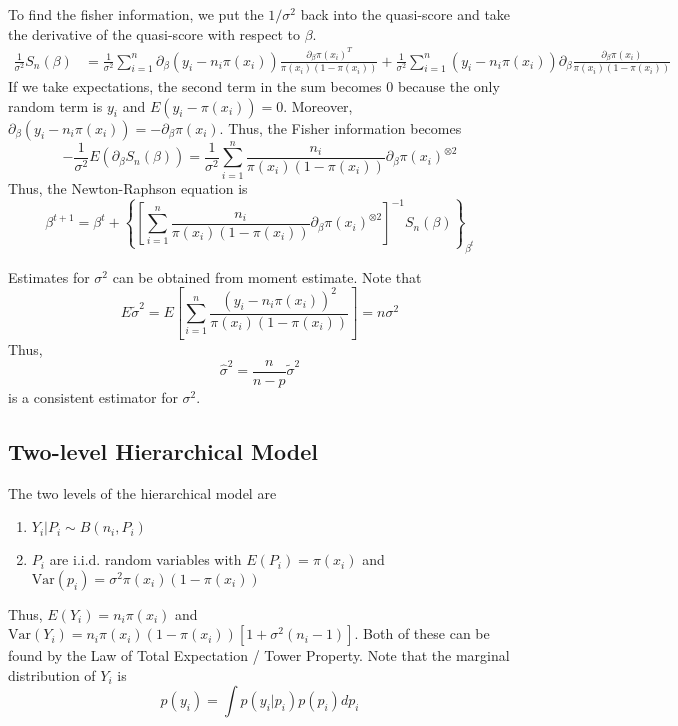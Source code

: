 \documentclass[12pt]{article}
\newcommand{\Var}{\mathrm{Var}}
\newcommand{\sumn}{\sum_{i=1}^n}
\numberwithin{equation}{section}
\begin{document}
To find the fisher information, we put the $1 / \sigma^2$ back into the quasi-score and take the derivative of the quasi-score with respect to $\beta$. 
\begin{align*}
  \frac{1}{\sigma^2} S_n(\beta) 
    &= \frac{1}{\sigma^2} \sumn \partial_{\beta} (y_i - n_i \pi(x_i)) \frac{\partial_{\beta} \pi(x_i)^T}{\pi(x_i)(1 - \pi(x_i))} + \frac{1}{\sigma^2} \sumn(y_i - n_i \pi(x_i)) \partial_\beta \frac{\partial_\beta \pi(x_i)}{\pi(x_i)(1 - \pi(x_i))}
\end{align*}
%
If we take expectations, the second term in the sum becomes 0 because the only random term is $y_i$ and $E(y_i - \pi(x_i)) = 0$. Moreover, $\partial_\beta (y_i - n_i \pi(x_i)) = -\partial_\beta \pi(x_i)$. Thus, the Fisher information becomes
\begin{equation*}
  -\frac{1}{\sigma^2} E(\partial_\beta S_n(\beta)) = 
    \frac{1}{\sigma^2} \sumn \frac{n_i}{\pi(x_i)(1 - \pi(x_i))} \partial_\beta \pi(x_i)^{\otimes 2}
\end{equation*}
%
Thus, the Newton-Raphson equation is
\begin{equation*}
  \beta^{t + 1} = \beta^t + 
    \left\{
      \left[
        \sumn \frac{n_i}{\pi(x_i)(1 - \pi(x_i))} \partial_{\beta} \pi(x_i)^{\otimes 2}
      \right] ^ {-1}
    S_n(\beta)
    \right\}_{\beta^t}
\end{equation*}

Estimates for $\sigma^2$ can be obtained from moment estimate. Note that
\begin{equation*}
  E \tilde{\sigma}^2 = E \left[
    \sumn \frac{(y_i - n_i \pi(x_i))^2}{\pi(x_i)(1 - \pi(x_i))}
  \right] = n\sigma^2
\end{equation*}
Thus,
\begin{equation*}
  \hat{\sigma}^2 = \frac{n}{n-p} \tilde{\sigma}^2
\end{equation*}
is a consistent estimator for $\sigma^2$.

\subsection{Two-level Hierarchical Model}
The two levels of the hierarchical model are
\begin{enumerate}
  \item $Y_i | P_i \sim B(n_i, P_i)$
  \item $P_i$ are i.i.d. random variables with $E(P_i) = \pi(x_i)$ and $\Var(p_i) = \sigma^2 \pi(x_i) (1 - \pi(x_i))$
\end{enumerate}
%
Thus, $E(Y_i) = n_i \pi(x_i)$ and 
$\Var(Y_i) = n_i \pi(x_i)(1 - \pi(x_i))[1 + \sigma^2(n_i - 1)]$. Both of these can be found by the Law of Total Expectation / Tower Property. Note that the marginal distribution of $Y_i$ is
\begin{equation*}
  p(y_i) = \int p(y_i | p_i) p(p_i) d p_i
\end{equation*}
\end{document}
